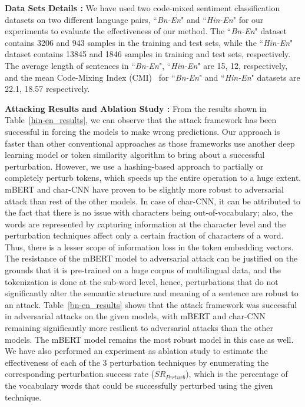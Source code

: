\documentclass[sigconf]{acmart}
\begin{document}
\textbf{Data Sets Details : }
We have used two code-mixed sentiment classification datasets on two different language pairs, ``\textit{Bn-En}" \cite{mandal2018preparing} and ``\textit{Hin-En}" \cite{patra2018sentiment} for our experiments to evaluate the effectiveness of our method. The ``\textit{Bn-En}" dataset contains 3206 and 943 samples in the training and test sets, while the ``\textit{Hin-En}" dataset contains 13845 and 1846 samples in training and test sets, respectively. The average length of sentences in ``\textit{Bn-En}", ``\textit{Hin-En}" are 15, 12, respectively, and the mean
Code-Mixing Index (CMI)~\cite{das-gamback-2014-identifying} for ``\textit{Bn-En}" and ``\textit{Hin-En}" datasets are  22.1, 18.57 respectively.

\textbf{Attacking Results and Ablation Study : }
From the results shown in Table~\ref{hin-en_results}, we can observe that the attack framework has been successful in forcing the models to make wrong predictions. Our approach is faster than other conventional approaches as those frameworks use another deep learning model or token similarity algorithm to bring about a successful perturbation. However, we use a hashing-based approach to partially or completely perturb tokens, which speeds up the entire operation to a huge extent.
mBERT and char-CNN have proven to be slightly more robust to adversarial attack than rest of the other models. In case of char-CNN, it can be attributed to the fact that there is no issue with characters being out-of-vocabulary; also, the words are represented by capturing information at the character level and the perturbation techniques affect only a certain fraction of characters of a word. Thus, there is a lesser scope of information loss in the token embedding vectors. The resistance of the mBERT model to adversarial attack can be justified on the grounds that it is pre-trained on a huge corpus of multilingual data, and the tokenization is done at the sub-word level, hence, perturbations that do not significantly alter the semantic structure and meaning of a sentence are robust to an attack. 
Table~\ref{bn-en_results} shows that the attack framework was successful in adversarial attacks on the given models, with mBERT and char-CNN remaining significantly more resilient to adversarial attacks than the other models.
The mBERT model remains the most robust model in this case as well.\\
We have also performed an experiment as ablation study to estimate the effectiveness of each of the 3 perturbation techniques by enumerating the corresponding perturbation success rate ($SR_{Perturb}$), which is the percentage of the vocabulary words that could be successfully perturbed using the given technique.
\end{document}
